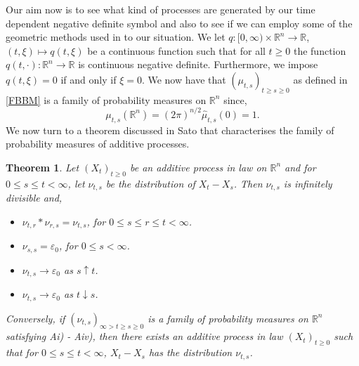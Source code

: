 \documentclass[a4paper, 12pt]{report}
\newtheorem{theorem}{Theorem}[section]
\theoremstyle{cor}
\theoremstyle{remark}
\theoremstyle{definition}
\begin{document}
Our aim now is to see what kind of processes are generated by our time dependent negative definite symbol and also to see if we can employ some of the geometric methods used in \cite{Paper} to our situation.  We let $q : [0, \infty) \times \mathbb{R}^n \to \mathbb{R}$, $(t, \xi) \mapsto q(t, \xi)$ be a continuous function such that for all $t \ge 0$ the function $q(t, \cdot) : \mathbb{R}^n \to \mathbb{R}$ is continuous negative definite.  Furthermore, we impose $q(t, \xi) = 0$ if and only if $\xi = 0$.  We now have that $(\mu_{t, s})_{t \ge s \ge 0}$ as defined in \eqref{FBBM} is a family of probability measures on $\mathbb{R}^n$ since,
$$
\mu_{t, s}(\mathbb{R}^n) = (2\pi)^{n/2}\hat{\mu}_{t, s}(0) = 1.
$$
We now turn to a theorem discussed in Sato \cite{Sato} that characterises the family of probability measures of additive processes.

\begin{theorem}\label{APfromTDCNDF}
Let $(X_t)_{t \ge 0}$ be an additive process in law on $\mathbb{R}^n$ and for $0 \le s \le t < \infty$, let $\nu_{t, s}$ be the distribution of $X_t - X_s$.  Then $\nu_{t, s}$ is infinitely divisible and,
\begin{itemize}

\item[Ai)] $\nu_{t, r}\ast\nu_{r, s} = \nu_{t, s}$, for $0 \le s \le r \le t < \infty$.

\item[Aii)] $\nu_{s, s} = \varepsilon_0$, for $0 \le s < \infty$.

\item[Aiii)] $\nu_{t, s} \to \varepsilon_0$ as $s \uparrow t$.

\item[Aiv)] $\nu_{t, s} \to \varepsilon_0$ as $t \downarrow s$.

\end{itemize}

Conversely, if $(\nu_{t, s})_{\infty > t \ge s \ge 0}$ is a family of probability measures on $\mathbb{R}^n$ satisfying Ai) - Aiv), then there exists an additive process in law $(X_t)_{t \ge 0}$ such that for $0 \le s \le t < \infty$, $X_t - X_s$ has the distribution $\nu_{t, s}$.
\end{theorem}
\end{document}

